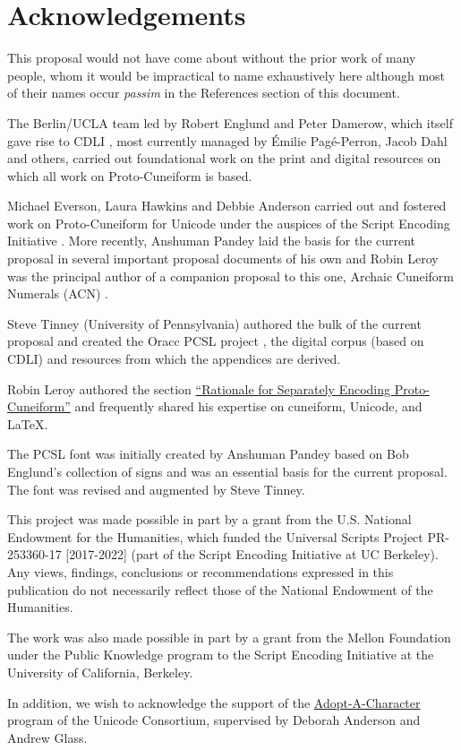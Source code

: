 \section*{Acknowledgements}

This proposal would not have come about without the prior work of
many people, whom it would be impractical to name exhaustively here
although most of their names occur \emph{passim} in the References
section of this document.

The Berlin/UCLA team led by Robert Englund and Peter Damerow, which
itself gave rise to CDLI \cite{CDLI}, most currently managed by Émilie
Pagé-Perron, Jacob Dahl and others, carried out foundational work
on the print and digital resources on which all work on
Proto-Cuneiform is based.

Michael Everson, Laura Hawkins and Debbie Anderson carried out and
fostered work on Proto-Cuneiform for Unicode under the auspices of
the Script Encoding Initiative
\cite{L2/16-267,L2/17-157,L2/19-284}. More recently, Anshuman Pandey
laid the basis for the current proposal in several important
proposal documents of his own \cite{L2/20-193,L2/22-239,L2/23-190}
and Robin Leroy was the principal author of a companion proposal to
this one, Archaic Cuneiform Numerals (ACN) \cite{L2/24-210}.

Steve Tinney (University of Pennsylvania) authored the bulk of the
current proposal and created the Oracc PCSL project \cite{PCSL}, the
digital corpus (based on CDLI) and resources from which the appendices
are derived.

Robin Leroy authored the section \hyperref[rationale]{``Rationale for
  Separately Encoding Proto-Cuneiform''} and frequently shared his
expertise on cuneiform, Unicode, and LaTeX.

The PCSL font was initially created by Anshuman Pandey based on Bob
Englund's collection of signs and was an essential basis for the
current proposal. The font was revised and augmented by Steve
Tinney.

This project was made possible in part by a grant from the
U.S. National Endowment for the Humanities, which funded the Universal
Scripts Project PR-253360-17 [2017-2022] (part of the Script Encoding
Initiative at UC Berkeley). Any views, findings, conclusions or
recommendations expressed in this publication do not necessarily
reflect those of the National Endowment of the Humanities.

The work was also made possible in part by a grant from the Mellon
Foundation under the Public Knowledge program to the Script Encoding
Initiative at the University of California, Berkeley.

In addition, we wish to acknowledge the support of the
\href{https://aac.unicode.org/}{Adopt-A-Character} program of the
Unicode Consortium, supervised by Deborah Anderson and Andrew Glass.

